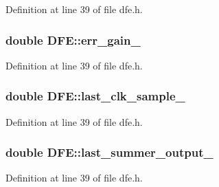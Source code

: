 Definition at line 39 of file dfe.\+h.

\hypertarget{class_d_f_e_a124c61874816baa299e8f212772ef1be}{}
\subsubsection[{err\+\_\+gain\+\_\+}]{\setlength{\rightskip}{0pt plus 5cm}double D\+F\+E\+::err\+\_\+gain\+\_\+\hspace{0.3cm}{\ttfamily [protected]}}\label{class_d_f_e_a124c61874816baa299e8f212772ef1be}


Definition at line 39 of file dfe.\+h.

\hypertarget{class_d_f_e_aab8957a2469ba78fda1e92f855b6fc1a}{}
\subsubsection[{last\+\_\+clk\+\_\+sample\+\_\+}]{\setlength{\rightskip}{0pt plus 5cm}double D\+F\+E\+::last\+\_\+clk\+\_\+sample\+\_\+\hspace{0.3cm}{\ttfamily [protected]}}\label{class_d_f_e_aab8957a2469ba78fda1e92f855b6fc1a}


Definition at line 39 of file dfe.\+h.

\hypertarget{class_d_f_e_af9c9a6e000775b9c20dfb78b80b77025}{}
\subsubsection[{last\+\_\+summer\+\_\+output\+\_\+}]{\setlength{\rightskip}{0pt plus 5cm}double D\+F\+E\+::last\+\_\+summer\+\_\+output\+\_\+\hspace{0.3cm}{\ttfamily [protected]}}\label{class_d_f_e_af9c9a6e000775b9c20dfb78b80b77025}


Definition at line 39 of file dfe.\+h.

\hypertarget{class_d_f_e_a469a8b4a5abe34c8fc769676a9c9ffbf}{}
